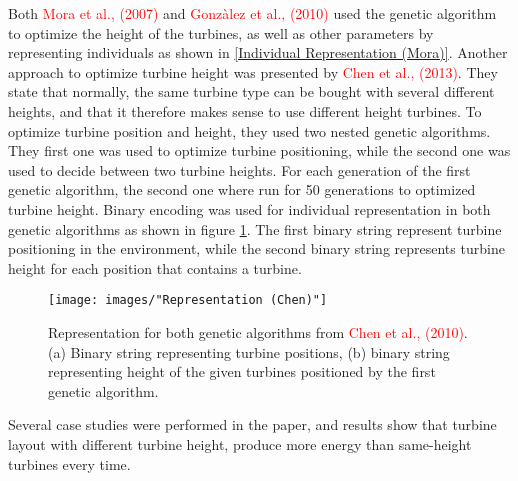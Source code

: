\noindent Both \textcolor{red}{Mora et al., (2007)} and \textcolor{red}{Gonzàlez et al., (2010)} used the genetic algorithm to optimize the height of the turbines, as well as other parameters by representing individuals as shown in \ref{Individual Representation (Mora)}. Another approach to optimize turbine height was presented by \textcolor{red}{Chen et al., (2013)}. They state that normally, the same turbine type can be bought with several different heights, and that it therefore makes sense to use different height turbines. To optimize turbine position and height, they used two nested genetic algorithms. They first one was used to optimize turbine positioning, while the second one was used to decide between two turbine heights. For each generation of the first genetic algorithm, the second one where run for 50 generations to optimized turbine height. Binary encoding was used for individual representation in both genetic algorithms as shown in figure \ref{Representation (Chen)}. The first binary string represent turbine positioning in the environment, while the second binary string represents turbine height for each position that contains a turbine.\\


\begin{figure}[h!]
\begin{center}
\texttt{[image: images/"Representation (Chen)"]}
\caption{Representation for both genetic algorithms from \textcolor{red}{Chen et al., (2010)}. (a) Binary string representing turbine positions, (b) binary string representing height of the given turbines positioned by the first genetic algorithm.}
\label{Representation (Chen)}
\end{center}
\end{figure}


\noindent Several case studies were performed in the paper, and results show that turbine layout with different turbine height, produce more energy than same-height turbines every time. \\


